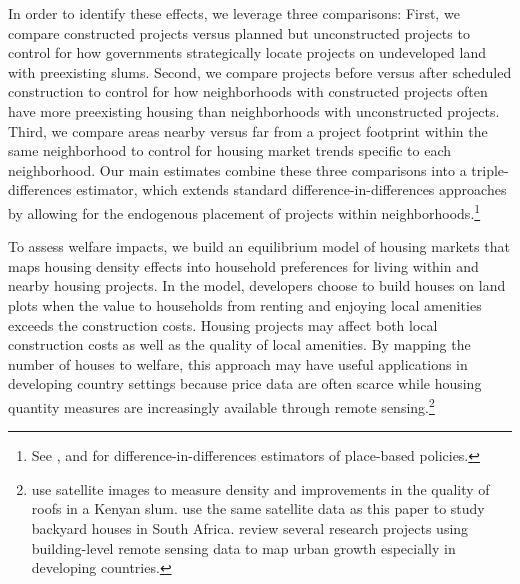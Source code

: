 \documentclass[12pt]{article}
\begin{document}
In order to identify these effects, we leverage three comparisons:  First, we compare constructed projects versus planned but unconstructed projects to control for how governments strategically locate projects on undeveloped land with preexisting slums.  Second, we compare projects before versus after scheduled construction to control for how neighborhoods with constructed projects often have more preexisting housing than neighborhoods with unconstructed projects.  Third, we compare areas nearby versus far from a project footprint within the same neighborhood to control for housing market trends specific to each neighborhood.  Our main estimates combine these three comparisons into a triple-differences estimator, which extends standard difference-in-differences approaches by allowing for the endogenous placement of projects within neighborhoods.\footnote{See \cite{rossi2010housing,hornbeck2017creative}, and \cite{diamond2016wants} for difference-in-differences estimators of place-based policies.}  

To assess welfare impacts, we build an equilibrium model of housing markets that maps housing density effects into household preferences for living within and nearby housing projects.  In the model, developers choose to build houses on land plots when the value to households from renting and enjoying local amenities exceeds the construction costs.  Housing projects may affect both local construction costs as well as the quality of local amenities.  By mapping the number of houses to welfare, this approach may have useful applications in developing country settings because price data are often scarce while housing quantity measures are increasingly available through remote sensing.\footnote{ \cite{marxthere} use satellite images to measure density and improvements in the quality of roofs in a Kenyan slum.  \cite{Brueckner2018backyarding} use the same satellite data as this paper to study backyard houses in South Africa. \cite{donaldson2016view} review several research projects using building-level remote sensing data to map urban growth especially in developing countries. }  
\end{document}
